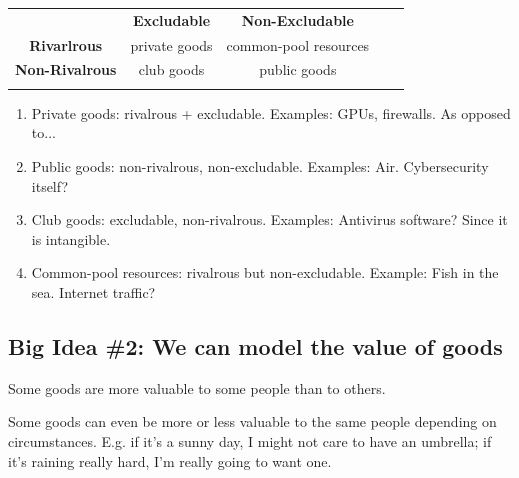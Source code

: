 \documentclass[11pt]{article}
\begin{document}
\begin{table}[]
    \centering
    \begin{tabular}{lccll}
    \cline{1-3}
    \multicolumn{1}{|l|}{\cellcolor[HTML]{EFEFEF}}                       & \multicolumn{1}{c|}{\cellcolor[HTML]{EFEFEF}\textbf{Excludable}} & \multicolumn{1}{c|}{\cellcolor[HTML]{EFEFEF}\textbf{Non-Excludable}} &  &  \\ \cline{1-3}
    \multicolumn{1}{|c|}{\cellcolor[HTML]{EFEFEF}\textbf{Rivarlrous}}    & \multicolumn{1}{c|}{private goods}                               & \multicolumn{1}{c|}{common-pool resources}                           &  &  \\ \cline{1-3}
    \multicolumn{1}{|c|}{\cellcolor[HTML]{EFEFEF}\textbf{Non-Rivalrous}} & \multicolumn{1}{c|}{club goods}                                  & \multicolumn{1}{c|}{public goods}                                    &  &  \\ \cline{1-3}
                                                                            & \multicolumn{1}{l}{}                                             & \multicolumn{1}{l}{}                                                 &  & 
    \end{tabular}
\end{table}

\begin{enumerate}
    \item Private goods: rivalrous + excludable. Examples: GPUs, firewalls. As opposed to...
    \item Public goods: non-rivalrous, non-excludable. Examples: Air. Cybersecurity itself?
    \item Club goods: excludable, non-rivalrous. Examples: Antivirus software? Since it is intangible. 
    \item Common-pool resources: rivalrous but non-excludable. Example: Fish in the sea. Internet traffic?
\end{enumerate}


\subsection{Big Idea \#2: We can model the value of goods}

Some goods are more valuable to some people than to others.

Some goods can even be more or less valuable to the same people depending on circumstances.
E.g. if it's a sunny day, I might not care to have an umbrella; if it's raining really hard, I'm really going to want one. 
\end{document}
